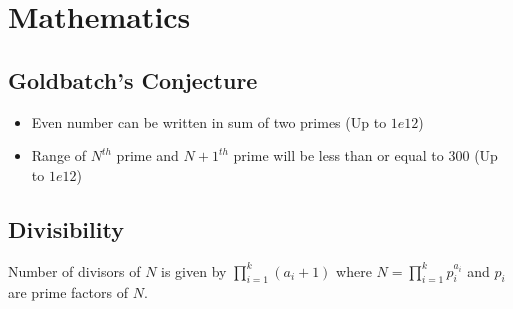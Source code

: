 \chapter{Mathematics}

\section{Goldbatch's Conjecture}

\begin{itemize}
	\item Even number can be written in sum of two primes (Up to $1e12$)
	\item Range of $N^{th}$ prime and $N+1^{th}$ prime will be less than or equal to $300$ (Up to $1e12$)
\end{itemize}

\section{Divisibility}

Number of divisors of $N$ is given by $\prod_{i=1}^{k}(a_i + 1)$ where $N = \prod_{i=1}^{k}p_{i}^{a_{i}}$ and $p_{i}$ are prime factors of $N$.